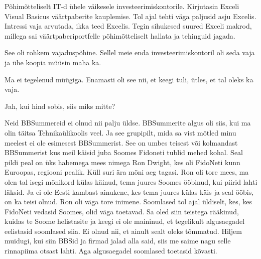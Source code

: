 
Põhimõtteliselt IT-d ühele väikesele investeerimiskontorile. Kirjutasin Exceli Visual Basicus väärtpaberite kauplemise. Tol ajal tehti väga paljusid asju Excelis. Intressi vaja arvutada, ikka teed Excelis. Tegin sihukesed suured Exceli makrod, millega sai väärtpaberiportfelle põhimõtteliselt hallata ja tehinguid jagada. 


See oli rohkem vajaduspõhine. Sellel meie enda investeerimiskontoril oli seda vaja ja ühe koopia müüsin maha ka. 


Ma ei  tegelenud müügiga. Enamasti oli see nii, et keegi tuli, ütles, et tal oleks ka vaja. 


Jah, kui hind sobis, siis miks mitte?


Neid BBSummereid ei olnud nii palju üldse. BBSummerite algus  oli siis, kui ma olin täitsa Tehnikaülikoolis veel. Ja see grupipilt, mida sa vist mõtled minu  meelest ei ole esimesest BBSummerist. See on umbes teisest või kolmandast BBSummerist kus meil käisid juba Soomes Fidoneti tublid mehed kohal. Seal pildi peal on üks habemega mees nimega Ron Dwight, kes oli FidoNeti kunn Euroopas, regiooni pealik. Küll suri ära mõni aeg tagasi. Ron oli tore mees, ma olen tal isegi mõnikord külas käinud, tema juures Soomes ööbinud, kui piirid lahti läksid. Ja ei ole Eesti kambast ainukene, kes tema juures külas käis ja seal ööbis, on ka teisi olnud. Ron oli väga tore inimene. Soomlased tol ajal üldiselt, kes, kes FidoNeti  vedasid Soomes,  olid väga toetavad. Sa oled siin teistega rääkinud, kuidas te Soome helistasite ja keegi ei ole maininud, et tegelikult algusaegadel eelistasid soomlased siia. Ei olnud nii, et ainult sealt oleks tõmmatud. Hiljem muidugi, kui siin BBSid ja firmad jalad alla said, siis me saime nagu selle rinnapiima otsast lahti. Aga algusaegadel soomlased toetasid kõvasti. 

